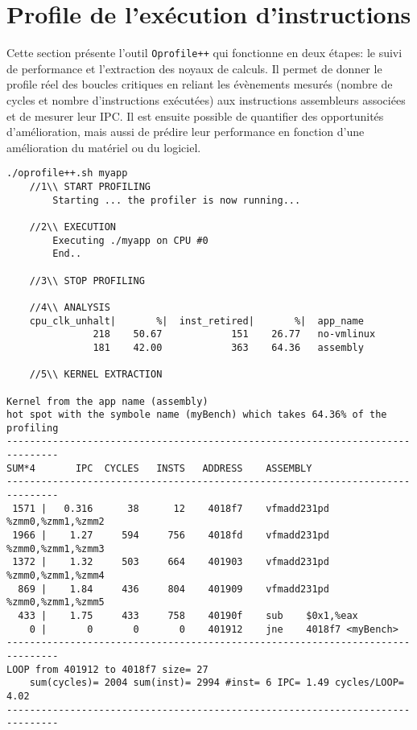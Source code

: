 \section{Profile de l'exécution d'instructions}\label{sec:oprofile}


Cette section présente l'outil \verb=Oprofile++= qui fonctionne en deux étapes: le suivi de performance et l'extraction des noyaux de calculs. Il permet de donner le profile réel des boucles critiques en reliant les évènements mesurés (nombre de cycles et nombre d'instructions exécutées) aux instructions assembleurs associées et de mesurer leur IPC. Il est ensuite possible de quantifier des opportunités d'amélioration, mais aussi de prédire leur performance en fonction d’une amélioration du matériel ou du logiciel.


\begin{lstlisting}[label=lst:dev_op_example, caption=L'outil Oprofile++ permet d'extraire les instructions des noyaux de calculs à partir du code binaire de l'application et d'y associer des mesures d'évènements.]
./oprofile++.sh myapp
    //1\\ START PROFILING
        Starting ... the profiler is now running...
        
    //2\\ EXECUTION 
        Executing ./myapp on CPU #0
        End..
    
    //3\\ STOP PROFILING
    
    //4\\ ANALYSIS 
    cpu_clk_unhalt|       %|  inst_retired|       %|  app_name
               218    50.67            151    26.77   no-vmlinux
               181    42.00            363    64.36   assembly
    
    //5\\ KERNEL EXTRACTION

Kernel from the app name (assembly) 
hot spot with the symbole name (myBench) which takes 64.36% of the profiling
-------------------------------------------------------------------------------
SUM*4       IPC  CYCLES   INSTS   ADDRESS    ASSEMBLY
-------------------------------------------------------------------------------
 1571 |   0.316      38      12    4018f7    vfmadd231pd %zmm0,%zmm1,%zmm2
 1966 |    1.27     594     756    4018fd    vfmadd231pd %zmm0,%zmm1,%zmm3
 1372 |    1.32     503     664    401903    vfmadd231pd %zmm0,%zmm1,%zmm4
  869 |    1.84     436     804    401909    vfmadd231pd %zmm0,%zmm1,%zmm5
  433 |    1.75     433     758    40190f    sub    $0x1,%eax
    0 |       0       0       0    401912    jne    4018f7 <myBench>
-------------------------------------------------------------------------------
LOOP from 401912 to 4018f7 size= 27
    sum(cycles)= 2004 sum(inst)= 2994 #inst= 6 IPC= 1.49 cycles/LOOP= 4.02
-------------------------------------------------------------------------------
\end{lstlisting}

